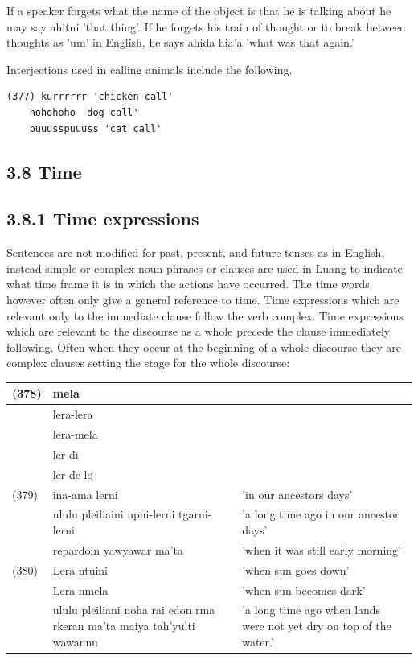 \documentclass[10pt]{article}
\begin{document}
If a speaker forgets what the name of the object is that he is talking about he may say ahitni 'that thing'. If he forgets his train of thought or to break between thoughts as 'um' in English, he says ahida hia'a 'what was that again.'

Interjections used in calling animals include the following.

\begin{verbatim}
(377) kurrrrrr 'chicken call'
    hohohoho 'dog call'
    puuusspuuuss 'cat call'
\end{verbatim}

\subsection*{3.8 Time}
\subsection*{3.8.1 Time expressions}
Sentences are not modified for past, present, and future tenses as in English, instead simple or complex noun phrases or clauses are used in Luang to indicate what time frame it is in which the actions have occurred. The time words however often only give a general reference to time. Time expressions which are relevant only to the immediate clause follow the verb complex. Time expressions which are relevant to the discourse as a whole precede the clause immediately following. Often when they occur at the beginning of a whole discourse they are complex clauses setting the stage for the whole discourse:

\begin{center}
\begin{tabular}{|l|l|l|}
\hline
(378) & mela &  \\
\hline
 & lera-lera &  \\
\hline
 & lera-mela &  \\
\hline
 & ler di &  \\
\hline
 & ler de lo &  \\
\hline
(379) & ina-ama lerni & 'in our ancestors days' \\
\hline
 & ululu pleiliaini upni-lerni tgarni-lerni & 'a long time ago in our ancestor days' \\
\hline
 & repardoin yawyawar ma'ta & 'when it was still early morning' \\
\hline
(380) & Lera ntuini & 'when sun goes down' \\
\hline
 & Lera nmela & 'when sun becomes dark' \\
\hline
 & ululu pleiliani noha rai edon rma rkeran ma'ta maiya tah'yulti wawannu & 'a long time ago when lands were not yet dry on top of the water.' \\
\hline
\end{tabular}
\end{center}
\end{document}
